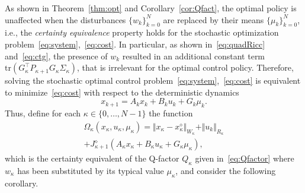\documentclass[10pt]{IEEEtran}      %
\newcommand{\tr}{\mathrm{tr}}
\theoremstyle{theorem}
\theoremstyle{remark}
\begin{document}
As shown in Theorem~\ref{thm:opt} and Corollary~\ref{cor:Qfact}, the optimal policy is unaffected when the disturbances
$\{w_k\}_{k=0}^N$ are replaced by their means $\{\mu_k\}_{k=0}^N$, i.e., the \emph{certainty equivalence} property \cite{bersekas2018reinf} 
holds for the stochastic optimization problem~\eqref{eq:system},~\eqref{eq:cost}. In particular, as shown in~\eqref{eq:quadRicc}
and~\eqref{eq:ctg}, the presence of $w_k$ resulted in an additional constant term $\tr(G_\kappa^\top P_{\kappa+1}G_\kappa \Sigma_\kappa)$,
that is irrelevant for the optimal control policy. Therefore, solving the stochastic optimal control problem~\eqref{eq:system},~\eqref{eq:cost}
is equivalent to minimize~\eqref{eq:cost} with respect to the deterministic dynamics
\begin{equation}
x_{k+1} = A_k x_k + B_k u_k+G_k\mu_k.
\label{eq:systemDet}%
\end{equation}
Thus, define for each $\kappa\in\{0,\dots,N-1\}$ the function
\begin{multline}
\Omega_\kappa(x_\kappa,u_\kappa,\mu_\kappa)=\Vert x_\kappa-x_\kappa^\diamond\Vert_{W_\kappa} +\Vert u_k\Vert_{R_\kappa}\\
+J_{\kappa+1}^\diamond(A_\kappa x_\kappa + B_\kappa u_\kappa+G_\kappa \mu_\kappa),
\end{multline}
which is the certainty equivalent of the Q-factor $Q_\kappa$ given in~\eqref{eq:Qfactor} where $w_\kappa$ has
been substituted by its typical value $\mu_\kappa$, and consider the following corollary.
\end{document}
